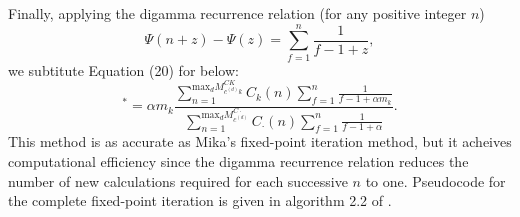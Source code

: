 \documentclass[a4paper]{article}
\begin{document}
Finally, applying the digamma recurrence relation (for any positive integer $n$) $$\Psi(n+z)-\Psi(z)=\sum_{f=1}^{n}\frac{1}{f-1+z},$$ we subtitute Equation (20) for below:
\begin{equation}
[\alpha m_k]^*=\alpha m_k\frac{\sum_{n=1}^{\mbox{max}_dM^{CK}_{c^{(d)}k}}C_k(n)\sum_{f=1}^n \frac{1}{f-1+\alpha m_k}}{\sum_{n=1}^{\mbox{max}_dM^{C\cdot}_{c^{(d)}}}C_\cdot(n)\sum_{f=1}^n \frac{1}{f-1+\alpha}}.
\end{equation}
This method is as accurate as Mika's fixed-point iteration method, but it acheives computational efficiency since the digamma recurrence relation reduces the number of new calculations required for each successive $n$ to one. Pseudocode
for the complete fixed-point iteration is given in algorithm 2.2 of \cite{wallach2008structured}.
\begin{comment}

\end{comment}
\end{document}
